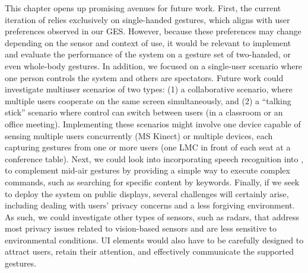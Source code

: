 This chapter opens up promising avenues for future work.
% 
First, the current iteration of \lui relies exclusively on single-handed gestures, which aligns with user preferences observed in our GES. However, because these preferences may change depending on the sensor and context of use, it would be relevant to implement and evaluate the performance of the system on a gesture set of two-handed, or even whole-body gestures.
% 
In addition, we focused on a single-user scenario where one person controls the system and others are spectators. Future work could investigate multiuser scenarios of two types: (1) a collaborative scenario, where multiple users cooperate on the same screen simultaneously, and (2) a ``talking stick'' scenario where control can switch between users (\eg in a classroom or an office meeting). Implementing these scenarios might involve one device capable of sensing multiple users concurrently (\eg MS Kinect) or multiple devices, each capturing gestures from one or more users (\eg one LMC in front of each seat at a conference table).
%
Next, we could look into incorporating speech recognition into \lui, to complement mid-air gestures by providing a simple way to execute complex commands, such as searching for specific content by keywords. 
% 
Finally, if we seek to deploy the system on public displays, several challenges will certainly arise, including dealing with users' privacy concerns and a less forgiving environment. 
As such, we could investigate other types of sensors, such as radars, that address most privacy issues related to vision-based sensors and are less sensitive to environmental conditions. UI elements would also have to be carefully designed to attract users, retain their attention, and effectively communicate the supported gestures.

